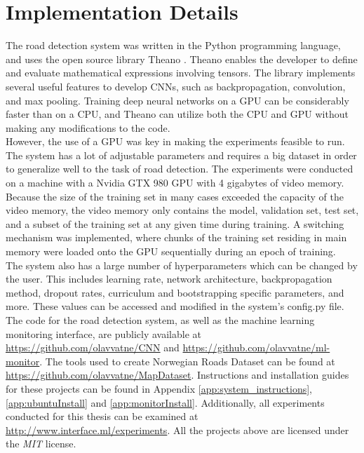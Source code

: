 \section{Implementation Details}
\label{sec:methods_implementation_details}
The road detection system was written in the Python programming language, and uses the open source library Theano \citep{bergstra_theano}. Theano enables the developer to define and evaluate mathematical expressions involving tensors. The library implements several useful features to develop \ac{CNN}s, such as backpropagation, convolution, and max pooling. Training deep neural networks on a \ac{GPU} can be considerably faster than on a \ac{CPU}, and Theano can utilize both the \ac{CPU} and \ac{GPU} without making any modifications to the code.\\

However, the use of a \ac{GPU} was key in making the experiments feasible to run. The system has a lot of adjustable parameters and requires a big dataset in order to generalize well to the task of road detection. The experiments were conducted on a machine with a Nvidia GTX 980 \ac{GPU} with 4 gigabytes of video memory. \\

Because the size of the training set in many cases exceeded the capacity of the video memory, the video memory only contains the model, validation set, test set, and a subset of the training set at any given time during training. A switching mechanism was implemented, where chunks of the training set residing in main memory were loaded onto the \ac{GPU} sequentially during an epoch of training.\\

The system also has a large number of hyperparameters which can be changed by the user. This includes learning rate, network architecture, backpropagation method, dropout rates, curriculum and bootstrapping specific parameters, and more. These values can be accessed and modified in the system's config.py file. \\

The code for the road detection system, as well as the machine learning monitoring interface, are publicly available at 
\url{https://github.com/olavvatne/CNN} and \url{https://github.com/olavvatne/ml-monitor}. The tools used to create Norwegian Roads Dataset can be found at \url{https://github.com/olavvatne/MapDataset}. Instructions and installation guides for these projects can be found in Appendix \ref{app:system_instructions}, \ref{app:ubuntuInstall} and \ref{app:monitorInstall}. Additionally, all experiments conducted for this thesis can be examined at \url{http://www.interface.ml/experiments}. All the projects above are licensed under the \emph{MIT} license.

